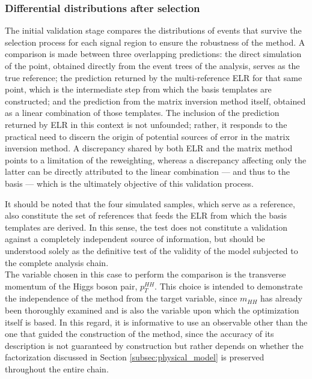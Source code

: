 \subsubsection{Differential distributions after selection}
%
The initial validation stage compares the distributions of events that survive the selection process for each signal region to ensure the robustness of the method.  A comparison is made between three overlapping predictions: the direct simulation of the point, obtained directly from the event trees of the analysis, serves as the true reference; the prediction returned by the multi-reference ELR for that same point, which is the intermediate step from which the basis templates are constructed; and the prediction from the matrix inversion method itself, obtained as a linear combination of those templates. The inclusion of the prediction returned by ELR in this context is not unfounded; rather, it responds to the practical need to discern the origin of potential sources of error in the matrix inversion method. A discrepancy shared by both ELR and the matrix method points to a limitation of the reweighting, whereas a discrepancy affecting only the latter can be directly attributed to the linear combination — and thus to the basis — which is the ultimately objective of this validation process.

It should be noted that the four simulated samples, which serve as a reference, also constitute the set of references that feeds the ELR from which the basis templates are derived. In this sense, the test does not constitute a validation against a completely independent source of information, but should be understood solely as the definitive test of the validity of the model subjected to the complete analysis chain.\\

The variable chosen in this case to perform the comparison is the transverse momentum of the Higgs boson pair, $p_T^{HH}$. This choice is intended to demonstrate the independence of the method from the target variable, since $m_{HH}$ has already been thoroughly examined and is also the variable upon which the optimization itself is based. In this regard, it is informative to use an observable other than the one that guided the construction of the method, since the accuracy of its description is not guaranteed by construction but rather depends on whether the factorization discussed in Section \ref{subsec:physical_model} is preserved throughout the entire chain.\\

